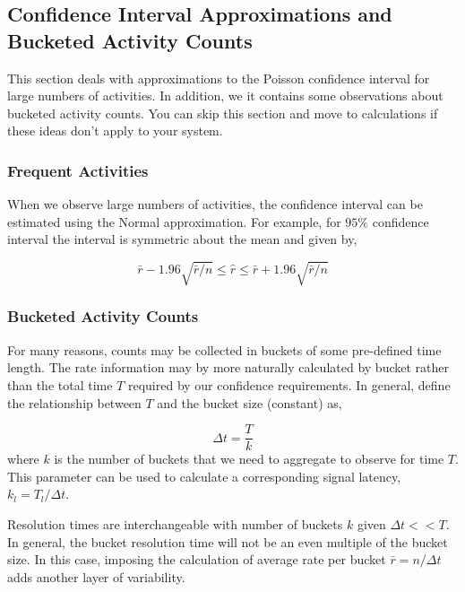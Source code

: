 \documentclass{article}
\begin{document}
\subsection{Confidence Interval Approximations and Bucketed Activity Counts}

This section deals with approximations to the Poisson confidence interval for large numbers of activities. In
addition, we it contains some observations about bucketed activity counts. You can skip this section and
move to calculations if these ideas don't apply to your system.

\subsubsection{Frequent Activities} 

When we observe large numbers of activities, the confidence interval can be estimated using the Normal
approximation. For example, for $95\%$ confidence interval the interval is symmetric about the mean
and given by,

\begin{equation}
    \label{eq:largenconf}
    \bar{r} - 1.96 \sqrt{\bar{r}/n} \leq \hat{r} \leq \bar{r} + 1.96 \sqrt{\bar{r}/n}
\end{equation}

\subsubsection{Bucketed Activity Counts}

For many reasons, counts may be collected in buckets of some pre-defined time length.  The rate information
may by more naturally calculated by bucket rather than the total time $T$ required by our confidence
requirements. In general, define the relationship between $T$ and the bucket size (constant) as,

\begin{equation}
    \label{eq:bucket}
    \Delta t = \frac{T}{k}
\end{equation}
where $k$ is the number of buckets that we need to aggregate to observe for time $T$. This parameter
can be used to calculate a corresponding signal latency, $k_l = T_l/\Delta t$.

Resolution times are interchangeable with number of buckets $k$ given $\Delta t << T$.  In general, the
bucket resolution time will not be an even multiple of the bucket size.  In this case, imposing the calculation
of average rate per bucket $\bar{r} = n/\Delta t$ adds another layer of variability.
\end{document}
